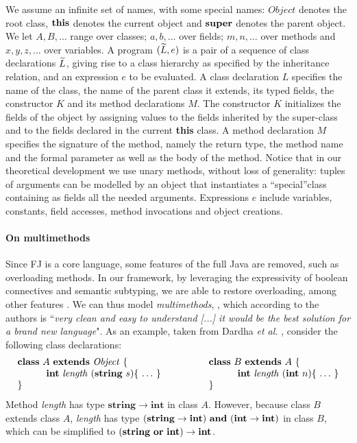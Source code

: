 We assume an infinite set of names, with some special names:
$\mathit{Object}$ denotes the root class, $\mathbf{this}$ denotes the current object and $\mathbf{super}$ denotes the parent object.
We let  $A, B,\ldots$ range over classes; $a, b,\ldots$ over fields; $m, n,\ldots$ over methods and $x, y, z, \ldots$ over variables.
A {program} $(\widetilde{L}, e)$ is a pair of a sequence of class declarations $\widetilde{L}$, giving rise to a class hierarchy as specified by the inheritance relation, and an expression $e$ to be evaluated. 
%
A class declaration $L$ specifies the name of the class, the name of the parent class it extends, its typed fields, the constructor $K$ and its method declarations $M$.
The constructor $K$ initializes the fields of the object by assigning values to the fields inherited by the super-class and to the fields declared in the current \textbf{this} class.
%
A method declaration $M$ specifies the signature of the method, namely the return type, the method name and the formal parameter as well as the body of the method.
Notice that in our theoretical development we use unary methods, without loss of generality: tuples of arguments can be modelled by an object that instantiates a ``special''class containing as fields all the needed arguments.
Expressions $e$ include variables, constants, field accesses, method invocations and object creations. 

\paragraph{On multimethods}
Since FJ is a core language, some features of the full Java are removed, such as overloading methods.
In our framework, by leveraging the expressivity of boolean connectives and semantic subtyping, we are able to restore overloading, among other features \cite[\S 8.4]{Dardha2017}.
We can thus model \emph{multimethods}, \cite{BC97}, which according to the authors is ``\emph{very clean and easy to understand [...] it would be the best solution for a brand new language}".
As an example, taken from Dardha \emph{et al.}  \cite{Dardha2013,Dardha2017}, consider the following class declarations:
$$
\begin{array}{ll}
\mathbf{class} \  A \ \mathbf{extends }\  \mathit{Object}\ \{
&
\qquad
\mathbf{class} \  B \ \mathbf{extends }\  A\ \{
\\
	\qquad\quad \mathbf{int}\ \mathit{length}\ (\mathbf{string}\ s)\{\ \ldots\ \}\qquad
&
	\qquad\qquad\quad \mathbf{int}\ \mathit{length}\ (\mathbf{int}\ n)\{\ \ldots\ \}
\\
\}
&
\qquad \}
\end{array}
$$
Method {\it length} has type $\mathbf{string} \rightarrow \mathbf{int}$ in class $A$.
However, because class $B$ extends class $A$,  {\it length} has type $(\mathbf{string} \rightarrow \mathbf{int})\ \mathbf{and}\ (\mathbf{int} \rightarrow \mathbf{int})$ in class $B$,
which can be simplified to $(\mathbf{string}\ \mathbf{or}\ \mathbf{int}) \rightarrow \mathbf{int}$.


